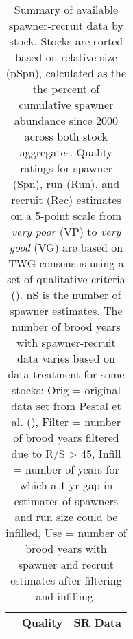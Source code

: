 \documentclass[french,11pt]{book}
\begin{document}
\endgroup{} \endgroup{}

\clearpage



\begingroup\fontsize{10}{12}\selectfont \begingroup\fontsize{10}{12}\selectfont  
\begin{longtable}[t]{llrrlllrrrr} \caption{\label{tab:DataOverviewSkeena}Summary of available spawner-recruit data by stock. Stocks are sorted based on relative size (pSpn), calculated as the the percent of cumulative spawner abundance since 2000 across both stock aggregates. Quality ratings for spawner (Spn), run (Run), and recruit (Rec) estimates on a 5-point scale from \emph{very poor} (VP) to \emph{very good} (VG) are based on TWG consensus using a set of qualitative criteria (). nS is the number of spawner estimates. The number of brood years with spawner-recruit data varies based on data treatment for some stocks: Orig = original data set from Pestal et al. (), Filter = number of brood years filtered due to R/S \textgreater{} 45, Infill = number of years for which a 1-yr gap in estimates of spawners and run size could be infilled, Use = number of brood years with spawner and recruit estimates after filtering and infilling.}\\ \toprule
\multicolumn{4}{c}{\textbf{ }} & \multicolumn{3}{c}{\textbf{Quality}} & \multicolumn{4}{c}{\textbf{SR Data}} \\

\end{longtable}
\end{document}
